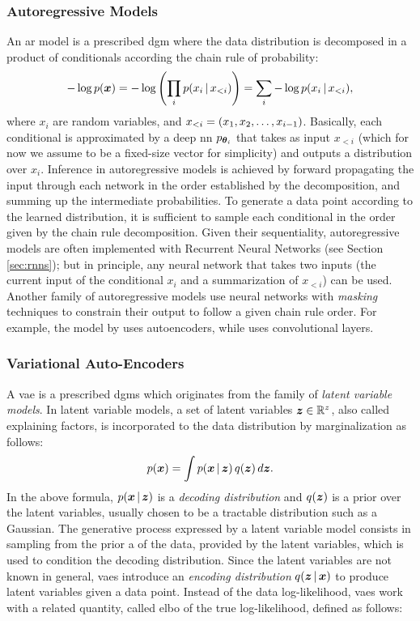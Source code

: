 \subsubsection*{Autoregressive Models}
An \gls{ar} model is a prescribed \gls{dgm} where the data distribution is decomposed in a product of conditionals according the chain rule of probability:
$$-\log p(\Vector{x}) = -\log\Par{\prod_i p(x_i \given x_{<i})} = \sum_i -\log p(x_i \given x_{<i}),$$
where $x_i$ are random variables, and $x_{<i} = \left( x_1, x_2, \ldots, x_{i-1} \right)$. Basically, each conditional is approximated by a deep \gls{nn} $p_{\boldsymbol{\theta}_i}$ that takes as input $x_{<i}$ (which for now we assume to be a fixed-size vector for simplicity) and outputs a distribution over $x_i$. Inference in autoregressive models is achieved by forward propagating the input through each network in the order established by the decomposition, and summing up the intermediate probabilities. To generate a data point according to the learned distribution, it is sufficient to sample each conditional in the order given by the chain rule decomposition. Given their sequentiality, autoregressive models are often implemented with Recurrent Neural Networks (see Section \ref{sec:rnns}); but in principle, any neural network that takes two inputs (the current input of the conditional $x_i$ and a summarization of $x_{<i}$) can be used. Another family of autoregressive models use neural networks with \emph{masking} techniques to constrain their output to follow a given chain rule order. For example, the model by \cite{germain2015made} uses autoencoders, while \cite{vandenoord2016wavenet} uses convolutional layers.

\subsubsection*{Variational Auto-Encoders}
A \gls{vae} \citep{kingma2014vae} is a prescribed \glspl{dgm} which originates from the family of \emph{latent variable models}. In latent variable models, a set of latent variables $\Vector{z} \in \Real^z$, also called explaining factors, is incorporated to the data distribution by marginalization as follows:
$$p(\Vector{x}) = \int p(\Vector{x} \given \Vector{z})\, q(\Vector{z})\, d\Vector{z}.$$
In the above formula, $p(\Vector{x} \given \Vector{z})$ is a \emph{decoding distribution} and $q(\Vector{z})$ is a prior over the latent variables, usually chosen to be a tractable distribution such as a Gaussian. The generative process expressed by a latent variable model consists in sampling from the prior a  of the data, provided by the latent variables, which is used to condition the decoding distribution. Since the latent variables are not known in general, \glspl{vae} introduce an \emph{encoding distribution} $q(\Vector{z} \given \Vector{x})$ to produce latent variables given a data point. Instead of the data log-likelihood, \glspl{vae} work with a related quantity, called \gls{elbo} of the true log-likelihood, defined as follows:


